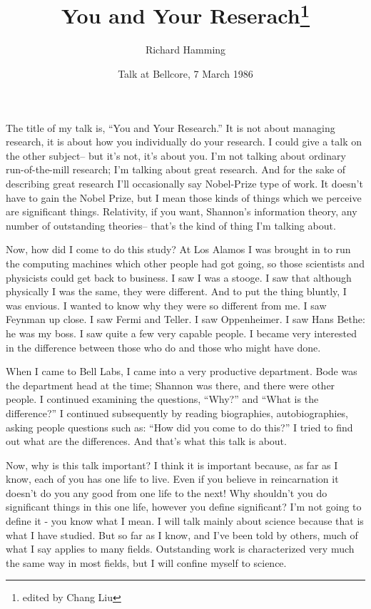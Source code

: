 \documentclass{article}
\title{You and Your Reserach\footnote{edited by Chang Liu}}
\author{Richard Hamming}
\date{Talk at Bellcore, 7 March 1986}
\begin{document}
\maketitle


The title of my talk is, ``You and Your Research.'' It is not about managing research, it is about how you individually do your research. I could give a talk on the other subject-- but it's not, it's about you. I'm not talking about ordinary run-of-the-mill research; I'm talking about great research. And for the sake of describing great research I'll occasionally say Nobel-Prize type of work. It doesn't have to gain the Nobel Prize, but I mean those kinds of things which we perceive are significant things. Relativity, if you want, Shannon's information theory, any number of outstanding theories-- that's the kind of thing I'm talking about.

Now, how did I come to do this study? At Los Alamos I was brought in to run the computing machines which other people had got going, so those scientists and physicists could get back to business. I saw I was a stooge. I saw that although physically I was the same, they were different. And to put the thing bluntly, I was envious. I wanted to know why they were so different from me. I saw Feynman up close. I saw Fermi and Teller. I saw Oppenheimer. I saw Hans Bethe: he was my boss. I saw quite a few very capable people. I became very interested in the difference between those who do and those who might have done.

When I came to Bell Labs, I came into a very productive department. Bode was the department head at the time; Shannon was there, and there were other people. I continued examining the questions, ``Why?'' and ``What is the difference?'' I continued subsequently by reading biographies, autobiographies, asking people questions such as: ``How did you come to do this?'' I tried to find out what are the differences. And that's what this talk is about.

Now, why is this talk important? I think it is important because, as far as I know, each of you has one life to live. Even if you believe in reincarnation it doesn't do you any good from one life to the next! Why shouldn't you do significant things in this one life, however you define significant? I'm not going to define it - you know what I mean. I will talk mainly about science because that is what I have studied. But so far as I know, and I've been told by others, much of what I say applies to many fields. Outstanding work is characterized very much the same way in most fields, but I will confine myself to science.
\end{document}

